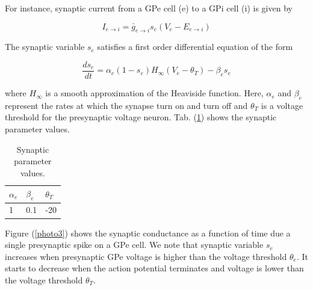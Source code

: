 For instance, synaptic current from a GPe cell (e) to a GPi cell (i) is given by

\begin{equation}
    I_{e\rightarrow i} = \bar{g}_{e\rightarrow i}s_{e}(V_{e}-E_{e\rightarrow i})
\end{equation}

The synaptic variable $s_{e}$ satisfies a first order differential equation of the form

\begin{equation}
    \frac{ds_{e}}{dt} = \alpha_{e}(1-s_{e})H_{\infty}(V_{e}-\theta_{T}) - \beta_{e}s_{e}
    \label{ref2}
\end{equation}

where $H_{\infty}$ is a smooth approximation of the Heaviside function. Here, $\alpha_{e}$ and $\beta_{e}$ represent the rates at which the synapse turn on and turn off and $\theta_{T}$ is a voltage threshold for the presynaptic voltage neuron. Tab. (\ref{t1}) shows the synaptic parameter values.

\begin{table}[h]
	\begin{tabularx}{\textwidth}{X | X | X}
		$\alpha_{e}$		& $\beta_{e}$			& $\theta_{T}$  \\ \hline
		1			& 0.1			& -20				\\ 
	\end{tabularx}
	\caption{Synaptic parameter values.}
	\label{t1}
\end{table}

Figure (\ref{photo3}) shows the synaptic conductance as a function of time due a single presynaptic spike on a GPe cell. We note that synaptic variable $s_{e}$ increases when presynaptic GPe voltage is higher than the voltage threshold $\theta_{e}$. It starts to decrease when the action potential terminates and voltage is lower than the voltage threshold $\theta_{T}$.

